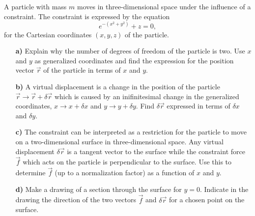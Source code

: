 \documentclass[11pt,a4paper]{report}
\newcounter{excount}[chapter]
\newenvironment{exercise}[1][]{\addtocounter{excount}{1} \noindent {\bf Problem
    \arabic{excount} \ \ #1}\hspace{2mm}}{\vspace{4mm}}
\begin{document}
\begin{exercise}
A particle with mass $m$ moves in three-dimensional space under the influence of a constraint. The constraint is expressed by the equation
\begin{equation}
e^{-(x^2+y^2)}+z=0,
\end{equation}
for the Cartesian coordinates $(x,y,z)$ of the particle.
\begin{itemize}
\item[\bf a)]Explain why the number of degrees of freedom of the particle is two. Use $x$ and $y$ as generalized coordinates and find the expression for the position vector $\vec r$ of the particle in terms of $x$ and $y$. 
\item[\bf b)]A virtual displacement is a change in the position of the particle $\vec r \to \vec r + \delta \vec r$ which is caused by an inifinitesimal change in the generalized coordinates, $x \to x + \delta x$ and $y\to y+\delta y$. Find $\delta \vec r$ expressed in terms of $\delta x$ and $\delta y$.
\item[\bf c)]The constraint can be interpreted as a restriction for the particle to move on a two-dimensional surface in three-dimensional space. Any virtual displacement $\delta \vec r$ is a tangent vector to the surface while the constraint force $\vec f$ which acts on the particle is perpendicular to the surface. Use this to determine $\vec f $ (up to a normalization factor) as a function of $x$ and $y$.
\item[\bf d)]Make a drawing of a section through the surface for $y=0$. Indicate in the drawing the direction of the two vectors $\vec f$ and $\delta \vec r$ for a chosen point on the surface.
\end{itemize}
\end{exercise}

%
%


\end{document}
